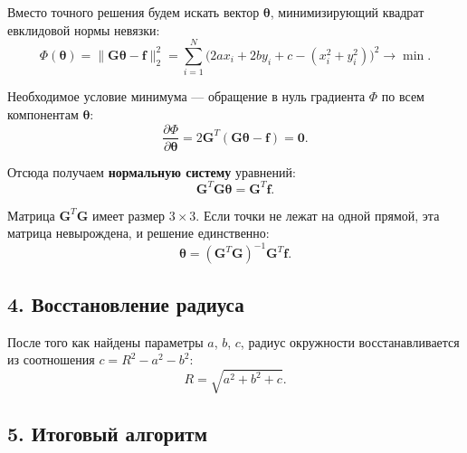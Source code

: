 \documentclass{article}
\begin{document}
Вместо точного решения будем искать вектор $\boldsymbol{\theta}$, минимизирующий квадрат евклидовой нормы невязки:
\begin{equation}
\Phi(\boldsymbol{\theta}) = \|\mathbf{G}\boldsymbol{\theta} - \mathbf{f}\|_2^2 = \sum_{i=1}^{N} \bigl(2a x_i + 2b y_i + c - (x_i^2 + y_i^2)\bigr)^2 \to \min.
\end{equation}

Необходимое условие минимума --- обращение в нуль градиента $\Phi$ по всем компонентам $\boldsymbol{\theta}$:
\begin{equation}
\frac{\partial \Phi}{\partial \boldsymbol{\theta}} = 2\mathbf{G}^T(\mathbf{G}\boldsymbol{\theta} - \mathbf{f}) = \mathbf{0}.
\end{equation}

Отсюда получаем \textbf{нормальную систему} уравнений:
\begin{equation}
\mathbf{G}^T \mathbf{G} \boldsymbol{\theta} = \mathbf{G}^T \mathbf{f}.
\label{eq:43_normal}
\end{equation}

Матрица $\mathbf{G}^T \mathbf{G}$ имеет размер $3 \times 3$. Если точки не лежат на одной прямой, эта матрица невырождена, и решение единственно:
\begin{equation}
\boldsymbol{\theta} = (\mathbf{G}^T \mathbf{G})^{-1} \mathbf{G}^T \mathbf{f}.
\label{eq:43_sol}
\end{equation}

\subsection*{4. Восстановление радиуса}

После того как найдены параметры $a$, $b$, $c$, радиус окружности восстанавливается из соотношения $c = R^2 - a^2 - b^2$:
\begin{equation}
R = \sqrt{a^2 + b^2 + c}.
\end{equation}

\subsection*{5. Итоговый алгоритм}
\end{document}
